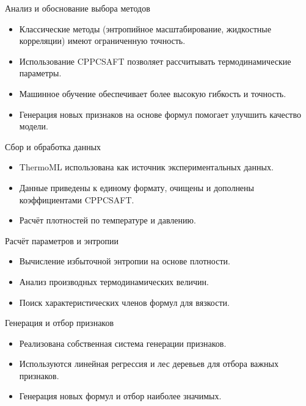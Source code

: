 \documentclass[aspectratio=169]{beamer}
\begin{document}
\begin{frame}{Анализ и обоснование выбора методов}
    \begin{itemize}
        \item Классические методы (энтропийное масштабирование, жидкостные корреляции) имеют ограниченную точность.
        \item Использование CPPCSAFT позволяет рассчитывать термодинамические параметры.
        \item Машинное обучение обеспечивает более высокую гибкость и точность.
        \item Генерация новых признаков на основе формул помогает улучшить качество модели.
    \end{itemize}
\end{frame}

\begin{frame}{Сбор и обработка данных}
    \begin{itemize}
        \item ThermoML использована как источник экспериментальных данных.
        \item Данные приведены к единому формату, очищены и дополнены коэффициентами CPPCSAFT.
        \item Расчёт плотностей по температуре и давлению.
    \end{itemize}
\end{frame}

\begin{frame}{Расчёт параметров и энтропии}
    \begin{itemize}
        \item Вычисление избыточной энтропии на основе плотности.
        \item Анализ производных термодинамических величин.
        \item Поиск характеристических членов формул для вязкости.
    \end{itemize}
\end{frame}

\begin{frame}{Генерация и отбор признаков}
    \begin{itemize}
        \item Реализована собственная система генерации признаков.
        \item Используются линейная регрессия и лес деревьев для отбора важных признаков.
        \item Генерация новых формул и отбор наиболее значимых.
    \end{itemize}
\end{frame}
\end{document}

